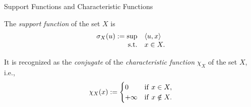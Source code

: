\documentclass[9pt]{beamer}
\begin{document}

  





\begin{frame}{Support Functions and Characteristic Functions}

  The \emph{support function} of the set $X$ is
  \[
    \begin{array}{rl}
      \sigma_X(u) := \sup & \left<u, x\right> \\
      \mathrm{s.t.} & x \in X.
    \end{array}
  \]

  It is recognized as the \emph{conjugate} of the \emph{characteristic function} $\chi_X$ of the set $X$, i.e.,
  \[
    \chi_{X}(x) := \begin{cases} 0 & {\rm{if}}~x\in X,\\ +\infty & {\rm{if}}~x\notin X. \end{cases}
  \]

  
\end{frame}
\end{document}

